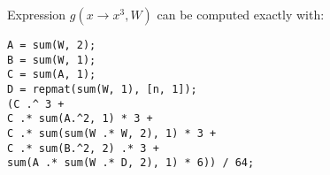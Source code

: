 Expression $g(x \rightarrow x^3, W)$ can be computed exactly with:
\begin{lstlisting}
A = sum(W, 2);
B = sum(W, 1);
C = sum(A, 1);
D = repmat(sum(W, 1), [n, 1]);
(C .^ 3 + 
C .* sum(A.^2, 1) * 3 +
C .* sum(sum(W .* W, 2), 1) * 3 +
C .* sum(B.^2, 2) .* 3 + 
sum(A .* sum(W .* D, 2), 1) * 6)) / 64;
\end{lstlisting}


